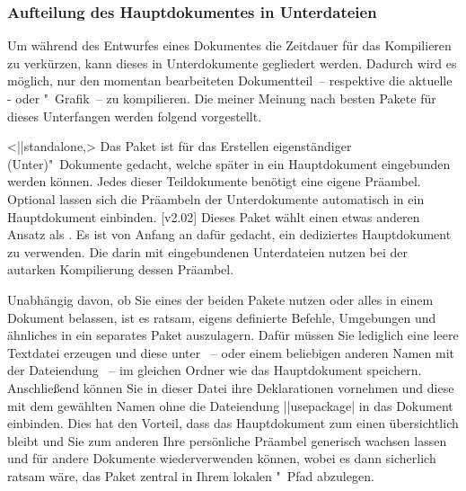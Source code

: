\subsubsection{Aufteilung des Hauptdokumentes in Unterdateien}
%
Um während des Entwurfes eines Dokumentes die Zeitdauer für das Kompilieren zu 
verkürzen, kann dieses in Unterdokumente gegliedert werden. Dadurch wird es 
möglich, nur den momentan bearbeiteten Dokumentteil~-- respektive die aktuelle 
- oder "~Grafik~-- zu kompilieren. Die meiner 
Meinung nach besten Pakete für dieses Unterfangen werden folgend vorgestellt.
%
\begin{DeclarePackages}
<\Bundle||{standalone},>
  Das Paket ist für das Erstellen eigenständiger (Unter)"~Dokumente gedacht, 
  welche später in ein Hauptdokument eingebunden werden können. Jedes dieser 
  Teildokumente benötigt eine eigene Präambel. Optional lassen sich die 
  Präambeln der Unterdokumente automatisch in ein Hauptdokument einbinden.
[v2.02]
  Dieses Paket wählt einen etwas anderen Ansatz als . Es 
  ist von Anfang an dafür gedacht, ein dediziertes Hauptdokument zu verwenden. 
  Die darin mit  eingebundenen Unterdateien nutzen bei der 
  autarken Kompilierung dessen Präambel.
\end{DeclarePackages}
%
Unabhängig davon, ob Sie eines der beiden Pakete nutzen oder alles in einem 
Dokument belassen, ist es ratsam, eigens definierte Befehle, Umgebungen und 
ähnliches in ein separates Paket auszulagern. Dafür müssen Sie lediglich eine 
leere Textdatei erzeugen und diese unter ~-- oder einem 
beliebigen anderen Namen mit der Dateiendung ~-- im gleichen Ordner 
wie das Hauptdokument speichern. Anschließend können Sie in dieser Datei ihre 
Deklarationen vornehmen und diese mit dem gewählten Namen ohne die Dateiendung
\Macro||{usepackage|} in das Dokument einbinden. Dies hat 
den Vorteil, dass das Hauptdokument zum einen übersichtlich bleibt und Sie zum 
anderen Ihre persönliche Präambel generisch wachsen lassen und für andere 
Dokumente wiederverwenden können, wobei es dann sicherlich ratsam wäre, das 
Paket zentral in Ihrem lokalen "~Pfad abzulegen. 



